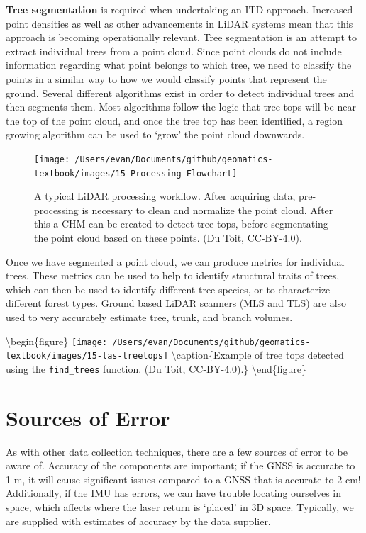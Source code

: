 \documentclass[
]{book}
\begin{document}
\textbf{Tree segmentation} is required when undertaking an ITD approach. Increased point densities as well as other advancements in LiDAR systems mean that this approach is becoming operationally relevant. Tree segmentation is an attempt to extract individual trees from a point cloud. Since point clouds do not include information regarding what point belongs to which tree, we need to classify the points in a similar way to how we would classify points that represent the ground. Several different algorithms exist in order to detect individual trees and then segments them. Most algorithms follow the logic that tree tops will be near the top of the point cloud, and once the tree top has been identified, a region growing algorithm can be used to `grow' the point cloud downwards.

\begin{figure}
\texttt{[image: /Users/evan/Documents/github/geomatics-textbook/images/15-Processing-Flowchart]} \caption{A typical LiDAR processing workflow. After acquiring data, pre-processing is necessary to clean and normalize the point cloud. After this a CHM can be created to detect tree tops, before segmentating the point cloud based on these points. (Du Toit, CC-BY-4.0).}\label{fig:15-Processing-Flowchart}
\end{figure}

Once we have segmented a point cloud, we can produce metrics for individual trees. These metrics can be used to help to identify structural traits of trees, which can then be used to identify different tree species, or to characterize different forest types. Ground based LiDAR scanners (MLS and TLS) are also used to very accurately estimate tree, trunk, and branch volumes.

\textbackslash begin\{figure\}
\texttt{[image: /Users/evan/Documents/github/geomatics-textbook/images/15-las-treetops]} \textbackslash caption\{Example of tree tops detected using the \texttt{find\_trees} function. (Du Toit, CC-BY-4.0).\}\label{fig:15-las-treetops}
\textbackslash end\{figure\}

\hypertarget{sources-of-error}{%
\section{Sources of Error}\label{sources-of-error}}

As with other data collection techniques, there are a few sources of error to be aware of. Accuracy of the components are important; if the GNSS is accurate to 1 m, it will cause significant issues compared to a GNSS that is accurate to 2 cm! Additionally, if the IMU has errors, we can have trouble locating ourselves in space, which affects where the laser return is `placed' in 3D space. Typically, we are supplied with estimates of accuracy by the data supplier.
\end{document}
